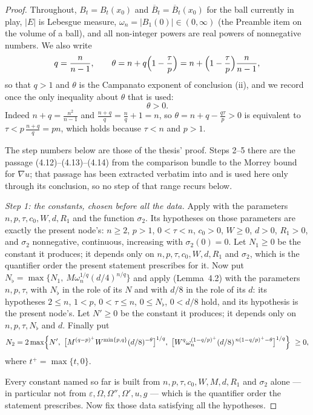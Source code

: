 \begin{proof}
Throughout, $B_t=B_t(x_0)$ and $\overline B_t=\overline B_t(x_0)$ for the ball
currently in play, $|E|$ is Lebesgue measure, $\omega_n=|B_1(0)|\in(0,\infty)$
(the Preamble item on the volume of a ball), and all non-integer powers are real
powers of nonnegative numbers.  We also write
\[
q=\frac n{n-1},\qquad
\theta=n+q\Bigl(1-\frac\tau p\Bigr)
=n+\Bigl(1-\frac\tau p\Bigr)\frac n{n-1},
\]
so that $q>1$ and $\theta$ is the Campanato exponent of conclusion (ii), and we
record once the only inequality about $\theta$ that is used:
\[
\theta>0 .
\tag{0}
\]
Indeed $n+q=\frac{n^2}{n-1}$ and $\frac{n+q}q=\frac nq+1=n$, so
$\theta=n+q-\frac{q\tau}p>0$ is equivalent to $\tau<p\,\frac{n+q}q=pn$, which
holds because $\tau<n$ and $p>1$.

The step numbers below are those of the thesis' proof.  Steps 2--5 there are
the passage (4.12)--(4.13)--(4.14) from the comparison bundle to the Morrey
bound for $\nabla u$; that passage has been extracted verbatim into
 and is used here only through its conclusion,
so no step of that range recurs below.

\emph{Step 1: the constants, chosen before all the data.}  Apply
 with the parameters $n,p,\tau,c_0,W,d,R_1$ and
the function $\sigma_2$.  Its hypotheses on those parameters are exactly the
present node's: $n\ge2$, $p>1$, $0<\tau<n$, $c_0>0$, $W\ge0$, $d>0$, $R_1>0$,
and $\sigma_2$ nonnegative, continuous, increasing with $\sigma_2(0)=0$.  Let
$N_1\ge0$ be the constant it produces; it depends only on
$n,p,\tau,c_0,W,d,R_1$ and $\sigma_2$, which is the quantifier order the
present statement prescribes for it.  Now put
$N_\flat=\max\bigl\{N_1,\ M\omega_n^{1/q}(d/4)^{n/q}\bigr\}$ and
  apply  (Lemma~4.2) with the parameters
  $n,p,\tau$, with $N_\flat$ in the role of its $N$ and with $d/8$ in the role
  of its $d$: its hypotheses $2\le n$, $1<p$, $0<\tau\le n$, $0\le N_\flat$,
  $0<d/8$ hold, and its hypothesis  is the
  present node's.  Let $N'\ge0$ be the constant it produces; it depends only on
  $n,p,\tau,N_\flat$ and $d$.  Finally put
  \[
  N_2=2\max\Bigl\{N',\
  \bigl[M^{(q-p)^{+}}W^{\min\{p,q\}}(d/8)^{-\theta}\bigr]^{1/q},\
  \bigl[W^q\omega_n^{(1-q/p)^{+}}(d/8)^{\,n(1-q/p)^{+}-\theta}\bigr]^{1/q}\Bigr\}
  \ \ge0 ,
  \]
  where $t^{+}=\max\{t,0\}$.

Every constant named so far is built from $n,p,\tau,c_0,W,M,d,R_1$ and
$\sigma_2$ alone --- in particular not from
$\varepsilon,\Omega,\Omega'',\Omega',u,g$ --- which is the quantifier order the
statement prescribes.  Now fix those data satisfying all the hypotheses.


\end{proof}

